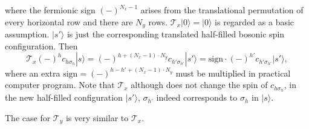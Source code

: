 \documentclass[eprint]{article} %
\begin{document}
where the fermionic sign $(-)^{N_{x}-1}$ arises from the translational permutation of every horizontal row and there are $N_{y}$ rows. $\mathcal{T}_{x}|0\rangle=|0\rangle$ is regarded as a basic assumption. $|s{'}\rangle$ is just the corresponding translated half-filled bosonic spin configuration. Then
\begin{equation}
    \mathcal{T}_{x}(-)^{h}c_{h\sigma_{h}}|s\rangle=(-)^{h+(N_{x}-1)\cdot{N}_{y}}c_{h{'}\sigma_{h{'}}}|s{'}\rangle=\text{sign}\cdot(-)^{h{'}}c_{h{'}\sigma_{h{'}}}|s{'}\rangle,
    \label{<+label+>}
\end{equation}
where an extra $\text{sign}=(-)^{h-h{'}+(N_{x}-1)\cdot{N}_{y}}$ must be multiplied in practical computer program. Note that $\mathcal{T}_{x}$ although does not change the spin of $c_{h\sigma_{h}}$, in the new half-filled configuration $|s{'}\rangle$, $\sigma_{h{'}}$ indeed corresponds to $\sigma_{h}$ in $|s\rangle$.

The case for $\mathcal{T}_{y}$ is very similar to $\mathcal{T}_{x}$.

 

\end{document}

